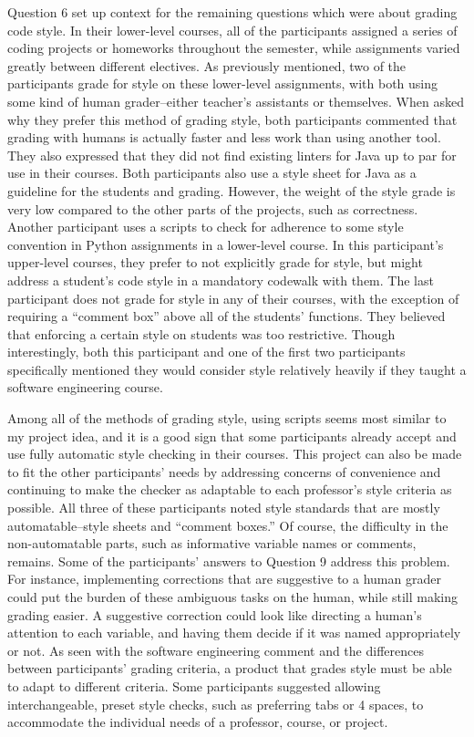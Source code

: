\documentclass[10pt,twocolumn]{article}
\begin{document}
Question 6 set up context for the remaining questions which were about grading code style. In their lower-level courses, all of the participants assigned a series of coding projects or homeworks throughout the semester, while assignments varied greatly between different electives. As previously mentioned, two of the participants grade for style on these lower-level assignments, with both using some kind of human grader–either teacher’s assistants or themselves. When asked why they prefer this method of grading style, both participants commented that grading with humans is actually faster and less work than using another tool. They also expressed that they did not find existing linters for Java up to par for use in their courses. Both participants also use a style sheet for Java as a guideline for the students and grading. However, the weight of the style grade is very low compared to the other parts of the projects, such as correctness. Another participant uses a scripts to check for adherence to some style convention in Python assignments in a lower-level course. In this participant’s upper-level courses, they prefer to not explicitly grade for style, but might address a student’s code style in a mandatory codewalk with them. The last participant does not grade for style in any of their courses, with the exception of requiring a “comment box” above all of the students’ functions. They believed that enforcing a certain style on students was too restrictive. Though interestingly, both this participant and one of the first two participants specifically mentioned they would consider style relatively heavily if they taught a software engineering course. 
	
Among all of the methods of grading style, using scripts seems most similar to my project idea, and it is a good sign that some participants already accept and use fully automatic style checking in their courses. This project can also be made to fit the other participants’ needs by addressing concerns of convenience and continuing to make the checker as adaptable to each professor’s style criteria as possible. All three of these participants noted style standards that are mostly automatable–style sheets and “comment boxes.” Of course, the difficulty in the non-automatable parts, such as informative variable names or comments, remains. Some of the participants’ answers to Question 9 address this problem. For instance, implementing corrections that are suggestive to a human grader could put the burden of these ambiguous tasks on the human, while still making grading easier. A suggestive correction could look like directing a human’s attention to each variable, and having them decide if it was named appropriately or not. As seen with the software engineering comment and the differences between participants’ grading criteria, a product that grades style must be able to adapt to different criteria. Some participants suggested allowing interchangeable, preset style checks, such as preferring tabs or 4 spaces, to accommodate the individual needs of a professor, course, or project. 


\printbibliography 
\end{document}

